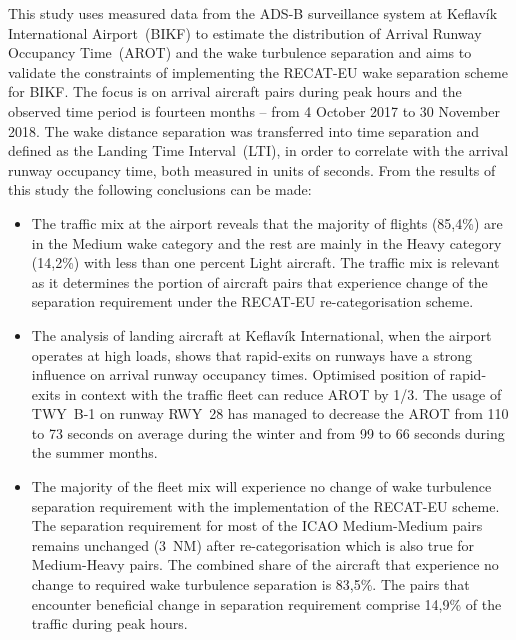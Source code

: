 This study uses measured data from the ADS-B surveillance system at Keflavík International Airport~(BIKF) to estimate the distribution of Arrival Runway Occupancy Time~(AROT) and the wake turbulence separation and aims to validate the constraints of implementing the RECAT-EU wake  separation scheme for BIKF. The focus is on arrival aircraft pairs during peak hours and the observed time period is fourteen months -- from 4 October 2017 to 30 November 2018. The wake distance separation was transferred into time separation and defined as the Landing Time Interval~(LTI), in order to correlate with the arrival runway occupancy time, both measured in units of seconds.
From the results of this study the following conclusions can be made:
\begin{itemize}

    \item The traffic mix at the airport reveals that the majority of flights (85,4\%) are in the Medium wake category and the rest are mainly in the Heavy category (14,2\%) with less than one percent Light aircraft. The traffic mix is relevant as it determines the portion of aircraft pairs that experience change of the separation requirement under the RECAT-EU re-categorisation scheme.

    \item The analysis of landing aircraft at Keflavík International, when the airport operates at high loads, shows that rapid-exits on runways have a strong influence on arrival runway occupancy times. Optimised position of rapid-exits in context with the traffic fleet can reduce AROT by 1/3. The usage of TWY~B-1 on runway RWY~28 has managed to decrease the AROT from 110 to 73 seconds on average during the winter and from 99 to 66 seconds during the summer months.
    
    \item The majority of the fleet mix will experience no change of wake turbulence separation requirement with the implementation of the RECAT-EU scheme. The separation requirement for most of the ICAO Medium-Medium pairs remains unchanged (3~NM) after re-categorisation which is also true for Medium-Heavy pairs. The combined share of the aircraft that experience no change to required wake turbulence separation is 83,5\%. The pairs that encounter beneficial change in separation requirement comprise 14,9\% of the traffic during peak hours.
    

\end{itemize}
